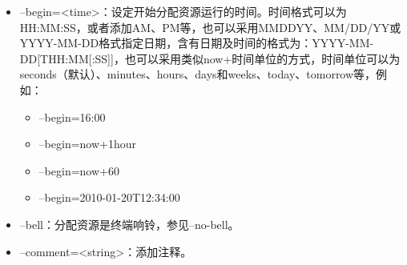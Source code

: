 \begin{itemize}
    \item --begin=<time>：设定开始分配资源运行的时间。时间格式可以为HH:MM:SS，或者添加AM、PM等，也可以采用MMDDYY、MM/DD/YY或YYYY-MM-DD格式指定日期，含有日期及时间的格式为：YYYY-MM-DD[THH:MM[:SS]]，也可以采用类似now+时间单位的方式，时间单位可以为seconds（默认）、minutes、hours、days和weeks、today、tomorrow等，例如：
\begin{itemize}
	\item --begin=16:00
    \item --begin=now+1hour
    \item --begin=now+60
    \item --begin=2010-01-20T12:34:00
\end{itemize}
    \item --bell：分配资源是终端响铃，参见--no-bell。
    \item --comment=<string>：添加注释。

\end{itemize}
